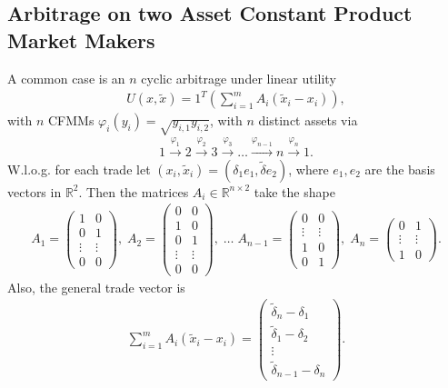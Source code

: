 \subsection{Arbitrage on two Asset Constant Product Market Makers}
A common case is an $n$ cyclic arbitrage under linear utility
\begin{align}
 U(x, \tilde{x}) =1^{T}\left(\sum_{i=1}^{m} A_i(\tilde{x}_i-x_i)\right) ,
\end{align}
with $n$ CFMMs $\varphi_i(y_i) =
\sqrt{y_{i,1}y_{i,2}}$, with $n$ distinct assets via
\begin{align}
    1 \xrightarrow{\varphi_1} 2 \xrightarrow{\varphi_2} 3
    \xrightarrow{\varphi_3} \hdots \xrightarrow{\varphi_{n-1}} n
    \xrightarrow{\varphi_n} 1.
\end{align}
W.l.o.g. for each trade let $(x_i, \tilde{x}_i) = (\delta_1e_1,
\tilde{\delta}e_2)$, where $e_1, e_2$ are the basis vectors in
$\mathbb{R}^{2}$. Then the matrices $A_i \in \mathbb{R}^{n\times2}  $ take the shape
\begin{align}
   A_1 =
   \begin{pmatrix}
   1 & 0 \\
   0 & 1 \\
   \vdots & \vdots \\
   0 & 0
    \end{pmatrix},\;
   A_2 =
   \begin{pmatrix}
   0 & 0 \\
   1 & 0 \\
   0 & 1 \\
   \vdots & \vdots \\
   0 & 0
    \end{pmatrix},\; \ldots  \;
   A_{n-1} =
   \begin{pmatrix}
   0 & 0 \\
   \vdots & \vdots \\
   1 & 0\\
   0 & 1
    \end{pmatrix},\;
   A_n =
   \begin{pmatrix}
   0 & 1 \\
   \vdots & \vdots \\
   1 & 0
    \end{pmatrix}.
\end{align}
Also, the general trade vector is
\begin{align}
    \sum_{i=1}^{m} A_i(\tilde{x}_i-x_i) =
    \begin{pmatrix}
        \tilde{\delta}_n - \delta_1\\
        \tilde{\delta}_1 -\delta_2\\
        \vdots\\
        \tilde{\delta}_{n-1} - \delta_n
    \end{pmatrix}.
\end{align}
